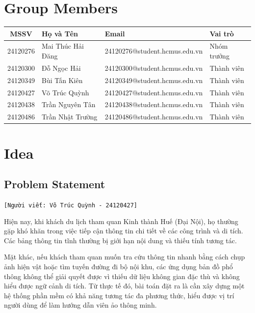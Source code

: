 \section{Group Members}
\begin{table}[H]
    \centering
    \begin{tabular}{|c|l|l|l|}
        \hline
        \textbf{MSSV} & \textbf{Họ và Tên} & \textbf{Email} & \textbf{Vai trò} \\ \hline
        24120276 & Mai Thúc Hải Đăng & 24120276@student.hcmus.edu.vn & Nhóm trưởng \\ \hline
        24120300 & Đỗ Ngọc Hải & 24120300@student.hcmus.edu.vn & Thành viên \\ \hline
        24120349 & Bùi Tấn Kiên & 24120349@student.hcmus.edu.vn & Thành viên \\ \hline
        24120427 & Võ Trúc Quỳnh & 24120427@student.hcmus.edu.vn & Thành viên \\ \hline
        24120438 & Trần Nguyên Tân & 24120438@student.hcmus.edu.vn & Thành viên \\ \hline
        24120486 & Trần Nhật Trường & 24120486@student.hcmus.edu.vn & Thành viên \\ \hline

    \end{tabular}
\end{table}

\section{Idea}
\subsection{Problem Statement}
\texttt{[Người viết: Võ Trúc Quỳnh - 24120427]}

Hiện nay, khi khách du lịch tham quan Kinh thành Huế (Đại Nội), họ thường gặp khó khăn trong việc tiếp cận thông tin chi tiết về các công trình và di tích. Các bảng thông tin tĩnh thường bị giới hạn nội dung và thiếu tính tương tác. 

Mặt khác, nếu khách tham quan muốn tra cứu thông tin nhanh bằng cách chụp ảnh hiện vật hoặc tìm tuyến đường đi bộ nội khu, các ứng dụng bản đồ phổ thông không thể giải quyết được vì thiếu dữ liệu không gian đặc thù và không hiểu được ngữ cảnh di tích. Từ thực tế đó, bài toán đặt ra là cần xây dựng một hệ thống phần mềm có khả năng tương tác đa phương thức, hiểu được vị trí người dùng để làm hướng dẫn viên ảo thông minh.

